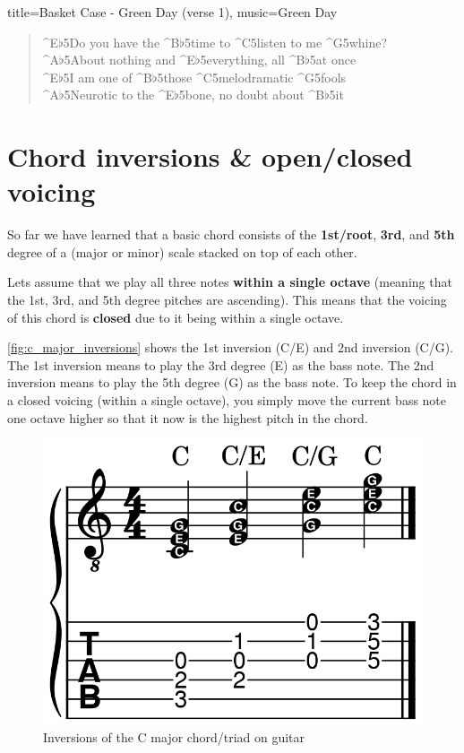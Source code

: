 \begin{song}[verse/numbered, align-chords=l]{title={Basket Case - Green Day (verse 1)}, music={Green Day}}
	\begin{verse}
		^{E$\flat$5}Do you have the ^{B$\flat$5}time to ^{C5}listen to me ^{G5}whine? \\
		^{A$\flat$5}About nothing and ^{E$\flat$5}everything, all ^{B$\flat$5}at once \\
		^{E$\flat$5}I am one of ^{B$\flat$5}those ^{C5}melodramatic ^{G5}fools \\
		^{A$\flat$5}Neurotic to the ^{E$\flat$5}bone, no doubt about ^{B$\flat$5}it \\
	\end{verse}
\end{song}

\newpage

\section{Chord inversions \& open/closed voicing}

So far we have learned that a basic chord consists of the \textbf{1st/root}, \textbf{3rd}, and \textbf{5th} degree of a (major or minor) scale stacked on top of each other.

Lets assume that we play all three notes\textbf{ within a single octave} (meaning that the 1st, 3rd, and 5th degree pitches are ascending). This means that the voicing of this chord is \textbf{closed} due to it being within a single octave.

\autoref{fig:c_major_inversions} shows the 1st inversion (C/E) and 2nd inversion (C/G). The 1st inversion means to play the 3rd degree (E) as the bass note. The 2nd inversion means to play the 5th degree (G) as the bass note. To keep the chord in a closed voicing (within a single octave), you simply move the current bass note one octave higher so that it now is the highest pitch in the chord.


\begin{figure}[h]
	\centering
	\includegraphics[height=0.13\textheight]{../../MuseScore/Guitar/CMajorInversions.png}
	\caption{Inversions of the C major chord/triad on guitar}
	\label{fig:c_major_inversions}
\end{figure}

